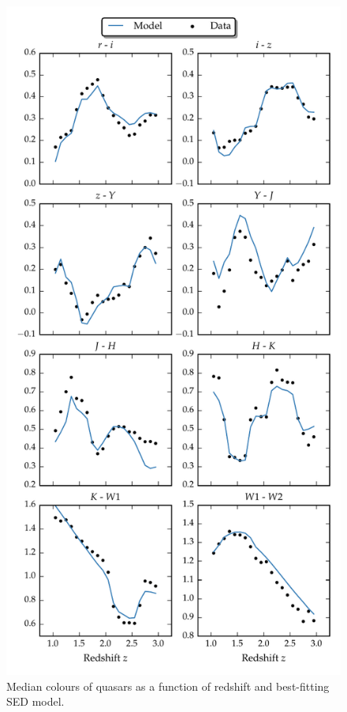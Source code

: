 \begin{figure}
\includegraphics[width=\textwidth]{figures/chapter05/sed_color_plot.pdf}
\caption[{Median colours of quasars as a function of redshift and best-fitting SED model.}]{Median colours of quasars as a function of redshift and best-fitting SED model.}
  \label{fig:color}
\end{figure} 

